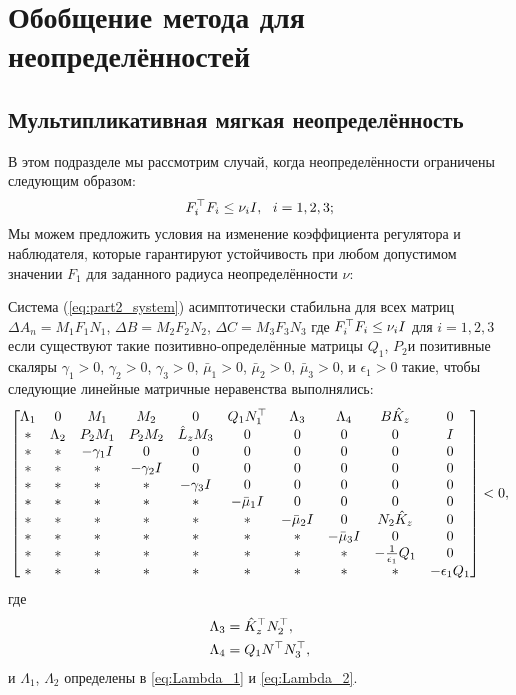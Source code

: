 \chapter{Обобщение метода для неопределённостей}\label{ch:ch4}
\section{Мультипликативная мягкая неопределённость}\label{sec:ch4/sect1}

В этом подразделе мы рассмотрим случай, когда неопределённости ограничены следующим образом:
%
\begin{equation}
	\label{eq:part2_nu_uncertainty}
	{F}_i^\top{F}_i\leq \nu_i {I}, \ \ i=1,2,3;
\end{equation}
%
Мы можем предложить условия на изменение коэффициента регулятора и наблюдателя, которые гарантируют устойчивость при любом допустимом значении ${F}_1$ для заданного радиуса неопределённости $\nu$:
\begin{theorem}\label{thm:part2_LMI_2}
	Система (\ref{eq:part2_system}) асимптотически стабильна для всех матриц
	$\Delta {A}_n={M}_1{F}_1{N}_1$, 
	$\Delta {B}= {M}_2{F}_2{N}_2$, 
	$\Delta {C} = {M}_3{F}_3{N}_3$
	где
	${F}_i^\top{F}_i\leq \nu_i {I}$ для $i=1,2,3$
	если существуют такие позитивно-определённые матрицы ${Q}_1$, ${P}_2$и позитивные скаляры
	$\gamma_1>0$, $\gamma_2>0$, $\gamma_3>0$, $\bar{\mu}_1>0$, $\bar{\mu}_2>0$, $\bar{\mu}_3>0$, и $\epsilon_1 > 0$ такие, чтобы следующие линейные матричные неравенства выполнялись:
	\begin{equation}
		\label{eq:thm4_final_LMI}
		\begin{bmatrix}
			{\Lambda}_1 & 0 & {M}_1 & {M}_2&0 & {Q}_1{N}_1^\top & {\Lambda}_3 &{\Lambda}_4 & {B}\hat{{K}}_z & 0\\
			* & {\Lambda}_2 & {P}_2{M}_1 & {P}_2{M}_2 & \hat{{L}}_z{M}_3& 0& 0&0&0&{I} \\
			* & * & -\gamma_1{I} & 0&0&0&0&0&0&0\\
			* & * &*  & -\gamma_2{I}&0&0&0&0&0&0\\
			*& * & * &*  & -\gamma_3{I}&0&0&0&0&0\\
			* &* & * & * & *&-\bar{\mu}_1{I}&0&0&0&0\\
			* & * & * &*& *&*&-\bar{\mu}_2{I}& 0&{N}_2\hat{{K}}_z&0\\
			*&*&* &* & * & * & *&-\bar{\mu}_3{I}&0&0\\
			* & * & *&*&* & *&*&*&-\frac{1}{\epsilon_1}{Q}_1&0\\
			* & * & * & *&*&*&*&*&*&-\epsilon_1{Q}_1\\
		\end{bmatrix}<0,
	\end{equation}
	где
	\begin{align}
		{\Lambda}_3&=\hat{{K}}_z^\top{N}_2^\top,\\ {\Lambda}_4&={Q}_1{N}^\top{N}_3^\top,
	\end{align}
	и ${\Lambda}_1$, ${\Lambda}_2$ определены в \eqref{eq:Lambda_1} и \eqref{eq:Lambda_2}. 
\end{theorem}
